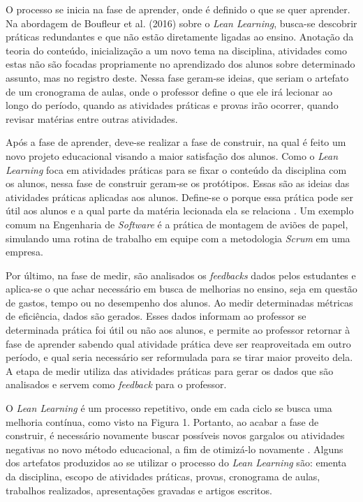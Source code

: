 O processo se inicia na fase de aprender, onde é definido o que se quer aprender. Na abordagem de Boufleur et al. (2016) sobre o \textit{Lean Learning}, busca-se descobrir práticas redundantes e que não estão diretamente ligadas ao ensino. Anotação da teoria do conteúdo, inicialização a um novo tema na disciplina, atividades como estas não são focadas propriamente no aprendizado dos alunos sobre determinado assunto, mas no registro deste. Nessa fase geram-se ideias, que seriam o artefato de um cronograma de aulas, onde o professor define o que ele irá lecionar ao longo do período, quando as atividades práticas e provas irão ocorrer, quando revisar matérias entre outras atividades.

Após a fase de aprender, deve-se realizar a fase de construir, na qual é feito um novo projeto educacional visando a maior satisfação dos alunos. Como o \textit{Lean Learning} foca em atividades práticas para se fixar o conteúdo da disciplina com os alunos, nessa fase de construir geram-se os protótipos. Essas são as ideias das atividades práticas aplicadas aos alunos. Define-se o porque essa prática pode ser útil aos alunos e a qual parte da matéria lecionada ela se relaciona \cite{LeanStartup2016}. Um exemplo comum na Engenharia de \textit{Software} é a prática de montagem de aviões de papel, simulando uma rotina de trabalho em equipe com a metodologia \textit{Scrum} em uma empresa.

Por último, na fase de medir, são analisados os \textit{feedbacks} dados pelos estudantes e aplica-se o que achar necessário em busca de melhorias no ensino, seja em questão de gastos, tempo ou no desempenho dos alunos. Ao medir determinadas métricas de eficiência, dados são gerados. Esses dados informam ao professor se determinada prática foi útil ou não aos alunos, e permite ao professor retornar à fase de aprender sabendo qual atividade prática deve ser reaproveitada em outro período, e qual seria necessário ser reformulada para se tirar maior proveito dela. A etapa de medir utiliza das atividades práticas para gerar os dados que são analisados e servem como \textit{feedback} para o professor.

O \textit{Lean Learning} é um processo repetitivo, onde em cada ciclo se busca uma melhoria contínua, como visto na Figura 1. Portanto, ao acabar a fase de construir, é necessário novamente buscar possíveis novos gargalos ou atividades negativas no novo método educacional, a fim de otimizá-lo novamente \cite{LeanStartup2016}. Alguns dos artefatos produzidos ao se utilizar o processo do \textit{Lean Learning} são: ementa da disciplina, escopo de atividades práticas, provas, cronograma de aulas, trabalhos realizados, apresentações gravadas e artigos escritos.